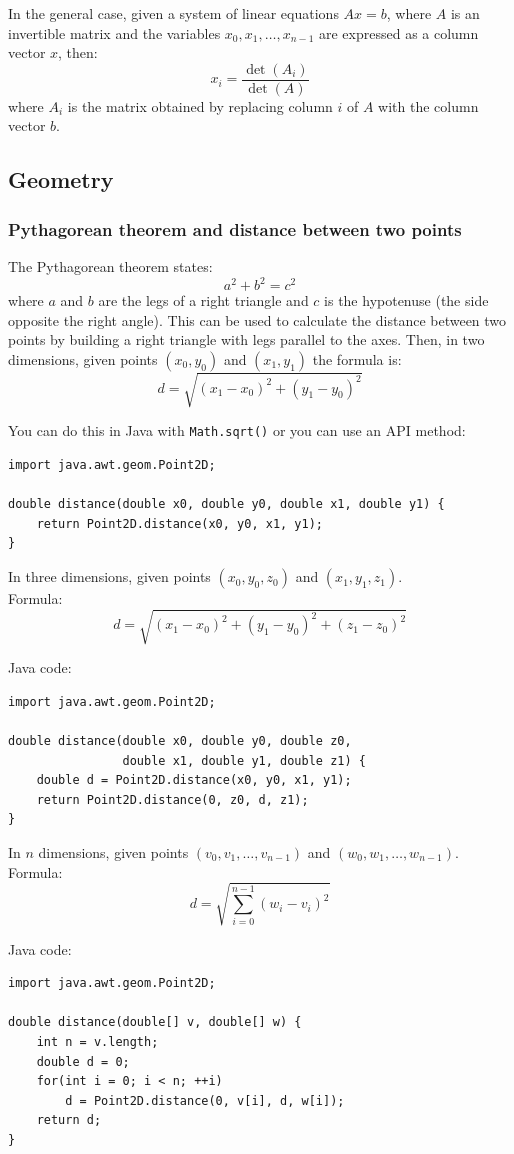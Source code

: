 \documentclass[a4paper,12pt]{article}
\begin{document}
\noindent In the general case, given a system of linear equations $Ax=b$, where $A$ is an invertible matrix and the variables $x_0,x_1,\ldots,x_{n-1}$ are expressed as a column vector $x$, then:
\[x_i=\frac{\det(A_i)}{\det(A)}\]
\noindent where $A_i$ is the matrix obtained by replacing column $i$ of $A$ with the column vector $b$.
\subsection{Geometry}
\subsubsection{Pythagorean theorem and distance between two points}
\noindent The Pythagorean theorem states:
\[a^2+b^2=c^2\]
\noindent where $a$ and $b$ are the legs of a right triangle and $c$ is the hypotenuse (the side opposite the right angle). This can be used to calculate the distance between two points by building a right triangle with legs parallel to the axes. Then, in two dimensions, given points $(x_0, y_0)$ and $(x_1, y_1)$ the formula is:
\[ d = \sqrt{(x_1 - x_0)^2 + (y_1 - y_0)^2} \]

\noindent You can do this in Java with \lstinline/Math.sqrt()/ or you can use an API method:
\begin{lstlisting}
import java.awt.geom.Point2D;

double distance(double x0, double y0, double x1, double y1) {
	return Point2D.distance(x0, y0, x1, y1);
}
\end{lstlisting}

\noindent In three dimensions, given points $(x_0, y_0, z_0)$ and $(x_1, y_1, z_1)$. \\ Formula:
\[ d = \sqrt{(x_1 - x_0)^2 + (y_1 - y_0)^2 + (z_1 - z_0)^2} \]

\noindent Java code:
\begin{lstlisting}
import java.awt.geom.Point2D;

double distance(double x0, double y0, double z0,
                double x1, double y1, double z1) {
	double d = Point2D.distance(x0, y0, x1, y1);
	return Point2D.distance(0, z0, d, z1);
}
\end{lstlisting}

\noindent In $n$ dimensions, given points $(v_0, v_1, \ldots, v_{n-1})$ and $(w_0, w_1, \ldots, w_{n-1})$. \\ Formula:
\[ d = \sqrt{\sum_{i=0}^{n-1}{(w_i - v_i)^2}} \]

\noindent Java code:
\begin{lstlisting}
import java.awt.geom.Point2D;

double distance(double[] v, double[] w) {
	int n = v.length;
	double d = 0;
	for(int i = 0; i < n; ++i)
		d = Point2D.distance(0, v[i], d, w[i]);
	return d;
}
\end{lstlisting}
\end{document}
